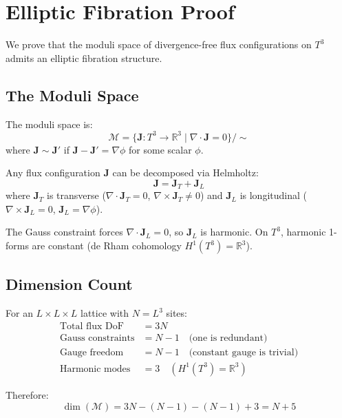 \documentclass[11pt,a4paper]{article}
\theoremstyle{definition}
\theoremstyle{remark}
\newcommand{\Rthree}{\mathbb{R}^3}
\begin{document}
\section{Elliptic Fibration Proof}
\label{app:fibration}

We prove that the moduli space of divergence-free flux configurations on $T^3$ admits an elliptic fibration structure.

\subsection*{The Moduli Space}

The moduli space is:
\begin{equation}
    \mathcal{M} = \{ \mathbf{J} : T^3 \to \Rthree \mid \nabla \cdot \mathbf{J} = 0 \} / \sim
\end{equation}
where $\mathbf{J} \sim \mathbf{J}'$ if $\mathbf{J} - \mathbf{J}' = \nabla\phi$ for some scalar $\phi$.

Any flux configuration $\mathbf{J}$ can be decomposed via Helmholtz:
\begin{equation}
    \mathbf{J} = \mathbf{J}_T + \mathbf{J}_L
\end{equation}
where $\mathbf{J}_T$ is transverse ($\nabla \cdot \mathbf{J}_T = 0$, $\nabla \times \mathbf{J}_T \neq 0$) and $\mathbf{J}_L$ is longitudinal ($\nabla \times \mathbf{J}_L = 0$, $\mathbf{J}_L = \nabla\phi$).

The Gauss constraint forces $\nabla \cdot \mathbf{J}_L = 0$, so $\mathbf{J}_L$ is harmonic. On $T^3$, harmonic 1-forms are constant (de Rham cohomology $H^1(T^3) = \mathbb{R}^3$).

\subsection*{Dimension Count}

For an $L \times L \times L$ lattice with $N = L^3$ sites:
\begin{align}
    \text{Total flux DoF} &= 3N \\
    \text{Gauss constraints} &= N - 1 \quad \text{(one is redundant)} \\
    \text{Gauge freedom} &= N - 1 \quad \text{(constant gauge is trivial)} \\
    \text{Harmonic modes} &= 3 \quad (H^1(T^3) = \mathbb{R}^3)
\end{align}

Therefore:
\begin{equation}
    \dim(\mathcal{M}) = 3N - (N-1) - (N-1) + 3 = N + 5
\end{equation}
\end{document}
